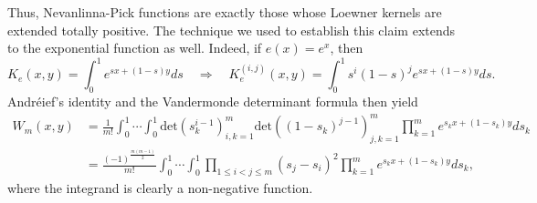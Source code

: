 \documentclass[twoside,a4paper]{amsart}
\renewcommand{\det}{\mathrm{det}}
\theoremstyle{remark}
\begin{document}
Thus, Nevanlinna-Pick functions are exactly those whose Loewner kernels are extended totally positive. The technique we used to establish this claim extends to the exponential function as well. Indeed, if \( e(x)=e^x \), then
\[
K_e(x,y) = \int_0^1 e^{sx+(1-s)y} ds \quad \Rightarrow \quad K_e^{(i,j)}(x,y) = \int_0^1 s^i(1-s)^j e^{sx+(1-s)y} ds.
\]
Andr\'eief's identity and the Vandermonde determinant formula then yield
\begin{align}
W_m(x,y) & = \frac1{m!} \int_0^1\cdots\int_0^1 \det\left( s_k^{i-1} \right)_{i,k=1}^m \det\left( (1-s_k)^{j-1} \right)_{j,k=1}^m  \prod_{k=1}^m e^{s_kx+(1-s_k)y} ds_k \\
& = \frac{(-1)^{\frac{m(m-1)}2}}{m!} \int_0^1\cdots\int_0^1 \prod_{1\leq i<j\leq m}(s_j-s_i)^2  \prod_{k=1}^m e^{s_kx+(1-s_k)y} ds_k,
\end{align}
where the integrand is clearly a non-negative function.
\end{document}
